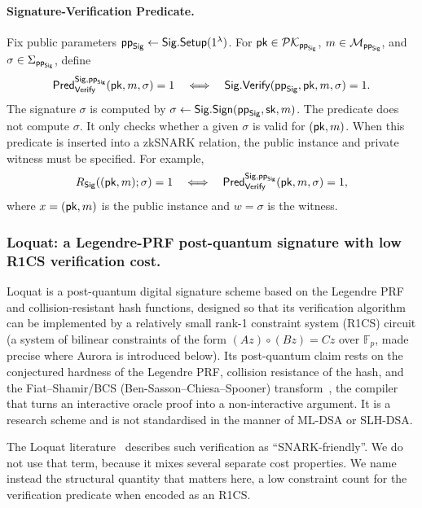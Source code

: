 \paragraph{Signature-Verification Predicate.}
Fix public parameters $\mathsf{pp}_{\mathsf{Sig}}\leftarrow\mathsf{Sig}.\mathsf{Setup}(1^\lambda)$. For $\mathsf{pk}\in\mathcal{PK}_{\mathsf{pp}_{\mathsf{Sig}}}$, $m\in\mathcal{M}_{\mathsf{pp}_{\mathsf{Sig}}}$, and $\sigma\in\Sigma_{\mathsf{pp}_{\mathsf{Sig}}}$, define
\begin{equation*}
  \mathsf{Pred}_{\mathsf{Verify}}^{\mathsf{Sig},\mathsf{pp}_{\mathsf{Sig}}}(\mathsf{pk},m,\sigma)=1
  \quad\Longleftrightarrow\quad
  \mathsf{Sig}.\mathsf{Verify}(\mathsf{pp}_{\mathsf{Sig}},\mathsf{pk},m,\sigma)=1.
\end{equation*}
The signature $\sigma$ is computed by $\sigma\leftarrow\mathsf{Sig}.\mathsf{Sign}(\mathsf{pp}_{\mathsf{Sig}},\mathsf{sk},m)$. The predicate does not compute $\sigma$. It only checks whether a given $\sigma$ is valid for $(\mathsf{pk},m)$. When this predicate is inserted into a zkSNARK relation, the public instance and private witness must be specified. For example,
\begin{equation*}
  R_{\mathsf{Sig}}((\mathsf{pk},m);\sigma)=1
  \quad\Longleftrightarrow\quad
  \mathsf{Pred}_{\mathsf{Verify}}^{\mathsf{Sig},\mathsf{pp}_{\mathsf{Sig}}}(\mathsf{pk},m,\sigma)=1,
\end{equation*}
where $x=(\mathsf{pk},m)$ is the public instance and $w=\sigma$ is the witness.

\subsubsection{Loquat: a Legendre-PRF post-quantum signature with low R1CS verification cost.}
Loquat is a post-quantum digital signature scheme based on the Legendre PRF and collision-resistant hash functions, designed so that its verification algorithm can be implemented by a relatively small rank-1 constraint system (R1CS) circuit (a system of bilinear constraints of the form $(Az)\circ(Bz)=Cz$ over $\mathbb{F}_p$, made precise where Aurora is introduced below). Its post-quantum claim rests on the conjectured hardness of the Legendre PRF, collision resistance of the hash, and the Fiat--Shamir/BCS (Ben-Sasson--Chiesa--Spooner) transform~\cite{bensasson2016iop}, the compiler that turns an interactive oracle proof into a non-interactive argument. It is a research scheme and is not standardised in the manner of ML-DSA or SLH-DSA.

The Loquat literature~\cite{cryptoeprint:2024/868} describes such verification as ``SNARK-friendly''. We do not use that term, because it mixes several separate cost properties. We name instead the structural quantity that matters here, a low constraint count for the verification predicate when encoded as an R1CS.

